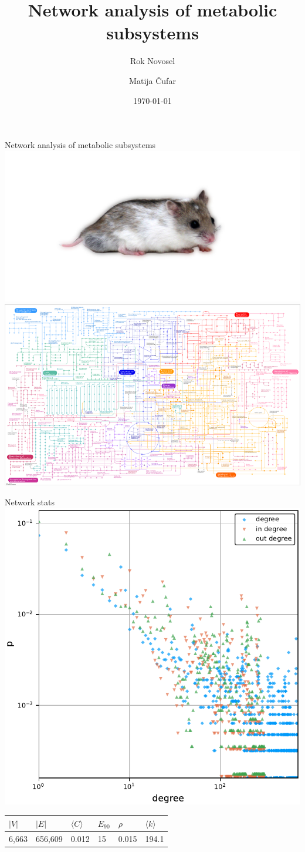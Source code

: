 \documentclass[unknownkeysallowed]{beamer}
\title[Network analysis of metabolic subsystems]{Network analysis of metabolic subsystems}
\author{Rok Novosel \and Matija Čufar} %
\institute[]
{
Faculty of Computer and Information Science \\
\medskip
}
\date{\today}
\begin{document}
\begin{frame}
\titlepage %
\end{frame}

\begin{frame}{Network analysis of metabolic subsystems}
  \includegraphics[width=.5\textwidth]{ch}
  \includegraphics[width=.5\textwidth]{network}
\end{frame}

\begin{frame}{Network stats}
  \centering
  \includegraphics[height=.6\textheight]{../../plots/degreesmall2}

  \begin{tabular}{l|l|l|l|l|l}
    $|V|$ & $|E|$ & $\langle C \rangle$ & $E_{90}$ & $\rho$ & $\langle k \rangle$ \\ \hline
    6,663 & 656,609 & 0.012 & 15 & 0.015 & 194.1
  \end{tabular}
\end{frame}
\end{document}
